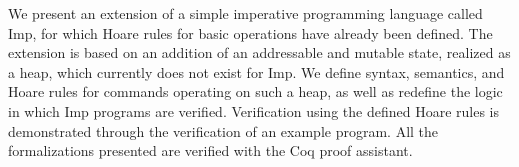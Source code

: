 We present an extension of a simple imperative programming language called Imp, for which Hoare rules for basic operations have already been defined. The extension is based on an addition of an addressable and mutable state, realized as a heap, which currently does not exist for Imp. We define syntax, semantics, and Hoare rules for commands operating on such a heap, as well as redefine the logic in which Imp programs are verified. Verification using the defined Hoare rules is demonstrated through the verification of an example program. All the formalizations presented are verified with the Coq proof assistant.